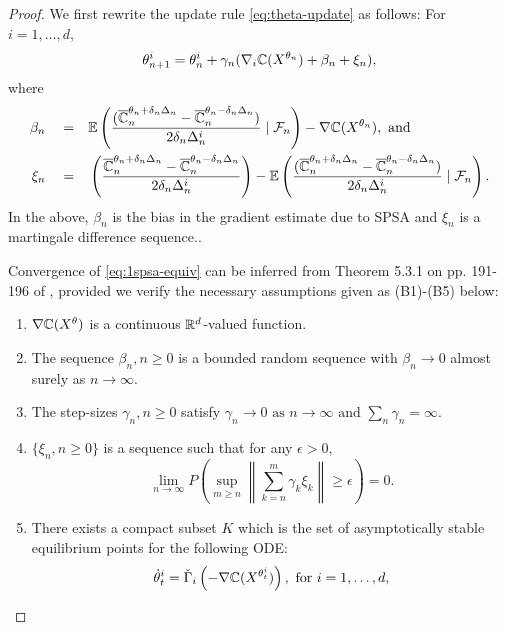 \begin{proof}

We first rewrite the update rule \eqref{eq:theta-update} as follows: For $i=1,\ldots,d$,
\begin{align}
\theta^{i}_{n+1}  =  \theta^{i}_n +  \gamma_n(\nabla_{i} \mathbb{C}(X^{\theta_n}) + \beta_n + \xi_n), 
\label{eq:1spsa-equiv}
\end{align}
where 
\begin{align*}
\beta_n \quad= &\quad \mathbb{E}\left(\dfrac{(\overline {\mathbb{C}}_n^{\theta_n + \delta_n \Delta_n} -\overline {\mathbb{C}}_n^{\theta_n - \delta_n \Delta_n})}{2 \delta_n \Delta_n^{i}} \mid \mathcal{F}_n \right) - \nabla \mathbb{C}(X^{\theta_n}), \text{ and}\\
\xi_n \quad = & \quad\left(\dfrac{\overline {\mathbb{C}}_n^{\theta_n + \delta_n \Delta_n} -\overline {\mathbb{C}}_n^{\theta_n - \delta_n \Delta_n}}{2 \delta_n\Delta_n^{i}}\right)  - \mathbb{E}\left(\dfrac{(\overline {\mathbb{C}}_n^{\theta_n + \delta_n \Delta_n} -\overline {\mathbb{C}}_n^{\theta_n - \delta_n \Delta_n})}{2 \delta_n \Delta_n^{i}}\mid \mathcal{F}_n \right).
\end{align*}
In the above, $\beta_n$ is the bias in the gradient estimate due to SPSA and $\xi_n$ is a martingale difference sequence..

Convergence of \eqref{eq:1spsa-equiv} can be inferred from Theorem 5.3.1 on pp. 191-196 of \cite{kushner-clark}, provided we verify the necessary assumptions given as (B1)-(B5) below:
\begin{enumerate}[\bfseries (B1)]
\item $\nabla \mathbb{C}(X^{\theta})$ is a continuous $\mathbb{R}^{d}$-valued function.
\item  The sequence $\beta_n,n\geq 0$ is a bounded random sequence with
$\beta_n \rightarrow 0$ almost surely as $n\rightarrow \infty$.
\item The step-sizes $\gamma_n,n\geq 0$ satisfy
$  \gamma_n\rightarrow 0 \mbox{ as }n\rightarrow\infty \text{ and } \sum_n \gamma_n=\infty.$
\item $\{\xi_n, n\ge 0\}$ is a sequence such that for any $\epsilon>0$,
\[ \lim_{n\rightarrow\infty} P\left( \sup_{m\geq n}  \left\|
\sum_{k=n}^{m} \gamma_k \xi_k\right\| \geq \epsilon \right) = 0. \]
\item There exists a compact subset $K$ which is the set of asymptotically stable equilibrium points for the following ODE:
\begin{align}
\dot\theta^{i}_t = \check\Gamma_{i}\left(- \nabla \mathbb{C}(X^{\theta^{i}_t})\right), \text{ for } i=1,\dots,d,\label{eq:pi-ode}
\end{align}
\end{enumerate} 


\end{proof}
